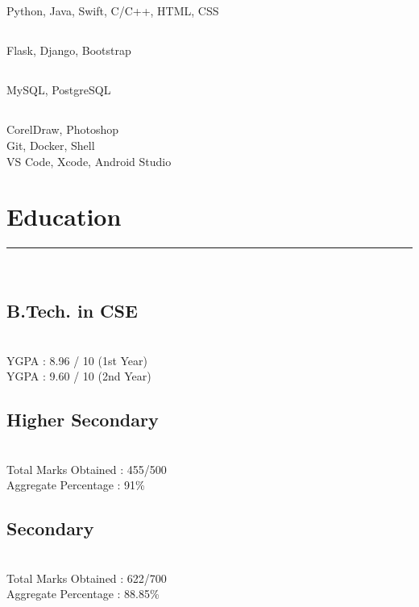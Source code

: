 \documentclass[]{debjitpal-resume}
\begin{document}
\begin{minipage}[t]{0.35\textwidth}
\subsection{}
Python, Java, Swift, C/C++, HTML, CSS
\vspace{6pt}
\subsection{}
Flask, Django, Bootstrap
\vspace{6pt}
\subsection{}
MySQL, PostgreSQL
\vspace{6pt}
\subsection{}
CorelDraw, Photoshop \\
Git, Docker, Shell \\
VS Code, Xcode, Android Studio
\section{Education} 
\noindent\rule{5cm}{0.4pt}\\
\subsection{B.Tech. in CSE}
 \\
YGPA : 8.96 / 10 (1st Year)\\
YGPA : 9.60 / 10 (2nd Year)\\
\vspace{8pt}
\subsection{Higher Secondary}
\\
Total Marks Obtained : 455/500 \\
Aggregate Percentage : 91\%\\
\vspace{8pt}
\subsection{Secondary}
\\
Total Marks Obtained : 622/700 \\
Aggregate Percentage : 88.85\%
%
%
\end{minipage} 
\end{document}
